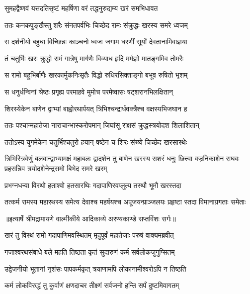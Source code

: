 \twolineshloka
{सुमहद्वैष्णवं यत्तदतिसृष्टं महर्षिणा}
{वरं तद्धनुरुद्यम्य खरं समभिधावत} %

\twolineshloka
{ततः कनकपुङ्खैस्तु शरैः संनतपर्वभिः}
{चिच्छेद रामः संक्रुद्धः खरस्य समरे ध्वजम्} %

\twolineshloka
{स दर्शनीयो बहुधा विच्छिन्नः काञ्चनो ध्वजः}
{जगाम धरणीं सूर्यो देवतानामिवाज्ञया} %

\twolineshloka
{तं चतुर्भिः खरः क्रुद्धो रामं गात्रेषु मार्गणैः}
{विव्याध हृदि मर्मज्ञो मातङ्गमिव तोमरैः} %

\twolineshloka
{स रामो बहुभिर्बाणैः खरकार्मुकनिःसृतैः}
{विद्धो रुधिरसिक्ताङ्गो बभूव रुषितो भृशम्} %

\twolineshloka
{स धनुर्धन्विनां श्रेष्ठः प्रगृह्य परमाहवे}
{मुमोच परमेष्वासः षट्शरानभिलक्षितान्} %

\twolineshloka
{शिरस्येकेन बाणेन द्वाभ्यां बाह्वोरथार्पयत्}
{त्रिभिश्चन्द्रार्धवक्त्रैश्च वक्षस्यभिजघान ह} %

\twolineshloka
{ततः पश्चान्महातेजा नाराचान्भास्करोपमान्}
{जिघांसू राक्षसं क्रुद्धस्त्रयोदश शिलाशितान्} %

\twolineshloka
{ततोऽस्य युगमेकेन चतुर्भिश्चतुरो हयान्}
{षष्ठेन च शिरः संख्ये चिच्छेद खरसारथेः} %

\fourlineshloka
{त्रिभिस्त्रिवेणुं बलवान्द्वाभ्यामक्षं महाबलः}
{द्वादशेन तु बाणेन खरस्य सशरं धनुः}
{छित्त्वा वज्रनिकाशेन राघवः प्रहसन्निव}
{त्रयोदशेनेन्द्रसमो बिभेद समरे खरम्} %

\twolineshloka
{प्रभग्नधन्वा विरथो हताश्वो हतसारथिः}
{गदापाणिरवप्लुत्य तस्थौ भूमौ खरस्तदा} %

\fourlineindentedshloka
{तत्कर्म रामस्य महारथस्य}
{ समेत्य देवाश्च महर्षयश्च}
{अपूजयन्प्राञ्जलयः प्रहृष्टा}
{स्तदा विमानाग्रगताः समेताः} %


{॥इत्यार्षे श्रीमद्रामायणे वाल्मीकीये आदिकाव्ये अरण्यकाण्डे सप्तविंशः सर्गः॥}


\twolineshloka
{खरं तु विरथं रामो गदापाणिमवस्थितम्}
{मृदुपूर्वं महातेजाः परुषं वाक्यमब्रवीत्} %

\twolineshloka
{गजाश्वरथसंबाधे बले महति तिष्ठता}
{कृतं सुदारुणं कर्म सर्वलोकजुगुप्सितम्} %

\twolineshloka
{उद्वेजनीयो भूतानां नृशंसः पापकर्मकृत्}
{त्रयाणामपि लोकानामीश्वरोऽपि न तिष्ठति} %

\twolineshloka
{कर्म लोकविरुद्धं तु कुर्वाणं क्षणदाचर}
{तीक्ष्णं सर्वजनो हन्ति सर्पं दुष्टमिवागतम्} %

